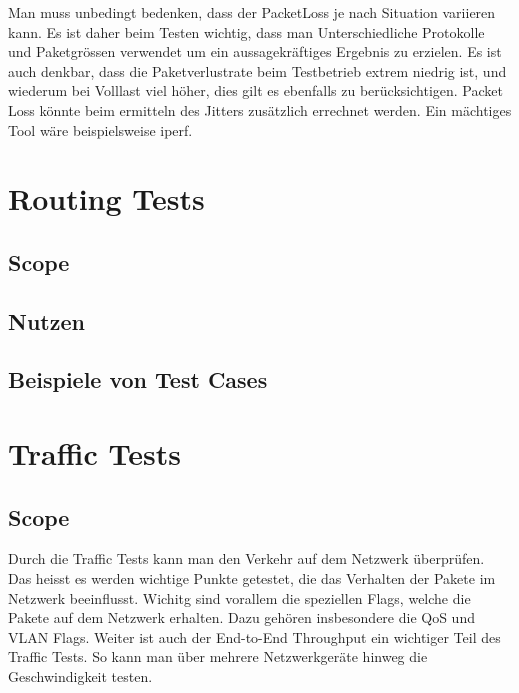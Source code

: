 \documentclass[a4,12pt]{scrartcl}
\begin{document}
\noindent Man muss unbedingt bedenken, dass der PacketLoss je nach Situation variieren kann. Es ist daher beim Testen wichtig, dass man Unterschiedliche Protokolle und Paketgrössen verwendet um ein aussagekräftiges Ergebnis zu erzielen. Es ist auch denkbar, dass die Paketverlustrate beim Testbetrieb extrem niedrig ist, und wiederum bei Volllast viel höher, dies gilt es ebenfalls zu berücksichtigen. Packet Loss könnte beim ermitteln des Jitters zusätzlich errechnet werden. Ein mächtiges Tool wäre beispielsweise iperf.
\section{Routing Tests}
\subsection{Scope}
\subsection{Nutzen}
\subsection{Beispiele von Test Cases}






\section{Traffic Tests}
\subsection{Scope}
Durch die Traffic Tests kann man den Verkehr auf dem Netzwerk überprüfen. Das heisst es werden wichtige Punkte getestet, die das Verhalten der Pakete im Netzwerk beeinflusst. Wichitg sind vorallem die speziellen Flags, welche die Pakete auf dem Netzwerk erhalten. Dazu gehören insbesondere die QoS und VLAN Flags.\newline
Weiter ist auch der End-to-End Throughput ein wichtiger Teil des Traffic Tests. So kann man über mehrere Netzwerkgeräte hinweg die Geschwindigkeit testen.
\end{document}
